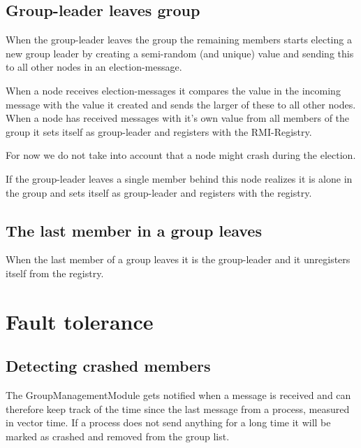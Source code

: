 \documentclass[english]{article}
\begin{document}

\subsection{Group-leader leaves group}
When the group-leader leaves the group the remaining members starts electing a new group leader by creating a semi-random (and unique) value and sending this to all other nodes in an election-message.

When a node receives election-messages it compares the value in the incoming message with the value it created and sends the larger of these to all other nodes. When a node has received messages with it's own value from all members of the group it sets itself as group-leader and registers with the RMI-Registry.

For now we do not take into account that a node might crash during the election.

If the group-leader leaves a single member behind this node realizes it is alone in the group and sets itself as group-leader and registers with the registry.

\subsection{The last member in a group leaves}
When the last member of a group leaves it is the group-leader and it unregisters itself from the registry.

\section{Fault tolerance}

\subsection{Detecting crashed members}
The GroupManagementModule gets notified when a message is received and can therefore keep track of the time since the last message from a process, measured in vector time. If a process does not send anything for a long time it will be marked as crashed and removed from the group list.
\end{document}
